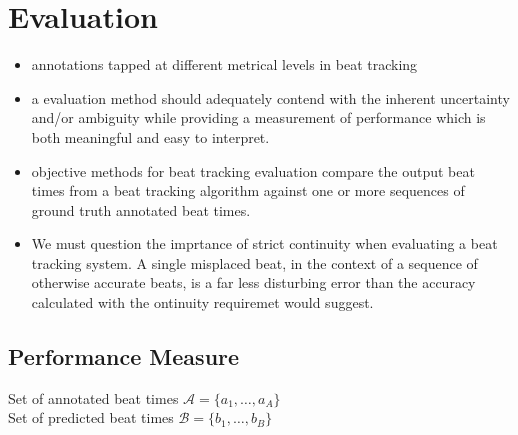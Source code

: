 \documentclass{scrartcl}
\begin{document}










\newpage
\section{Evaluation}


\begin{itemize}
\item annotations tapped at different metrical levels in beat tracking
\item a evaluation method should adequately contend with the inherent uncertainty and/or ambiguity while providing a measurement of performance which is both meaningful and easy to interpret. \cite{Davies2009b}
\item objective methods for beat tracking evaluation compare the output beat times from a beat tracking algorithm against one or more sequences of ground truth annotated beat times. \cite{Davies2009b}
\item We must question the imprtance of strict continuity when evaluating a beat tracking system. A single misplaced beat, in the context of a sequence of otherwise accurate beats, is a far less disturbing error than the accuracy calculated with the ontinuity requiremet would suggest. 
\end{itemize}


\subsection{Performance Measure}

Set of annotated beat times $\mathcal A = \{a_1, \dots, a_A\}$ \\
Set of predicted beat times $\mathcal B = \{b_1, \dots, b_B\}$ \\
\end{document}
